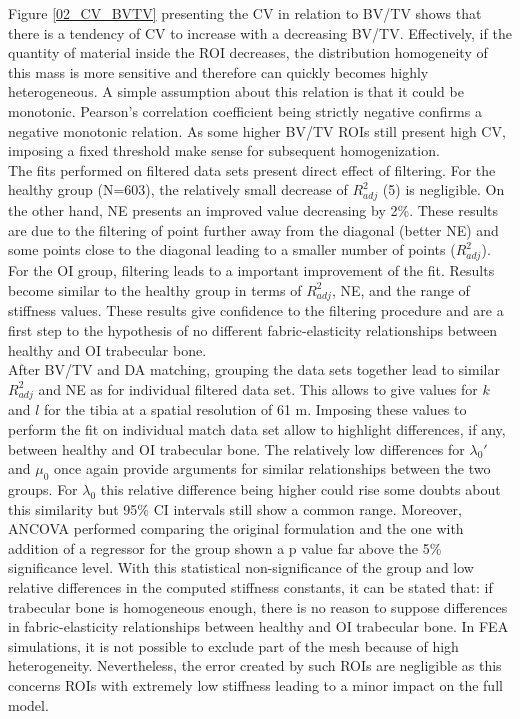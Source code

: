 \documentclass[a4paper,fleqn]{DC_ArtStyle}
\begin{document}
Figure \ref{02_CV_BVTV} presenting the CV in relation to BV/TV shows that there is a tendency of CV to increase with a decreasing BV/TV. Effectively, if the quantity of material inside the ROI decreases, the distribution homogeneity of this mass is more sensitive and therefore can quickly becomes highly heterogeneous. A simple assumption about this relation is that it could be monotonic. Pearson's correlation coefficient being strictly negative confirms a negative monotonic relation. As some higher BV/TV ROIs still present high CV, imposing a fixed threshold make sense for subsequent homogenization.\\

The fits performed on filtered data sets present direct effect of filtering. For the healthy group (N=603), the relatively small decrease of $R^2_{adj}$ (5\textperthousand) is negligible. On the other hand, NE presents an improved value decreasing by 2\%. These results are due to the filtering of point further away from the diagonal (better NE) and some points close to the diagonal leading to a smaller number of points ($R^2_{adj}$). For the OI group, filtering leads to a important improvement of the fit. Results become similar to the healthy group in terms of $R^2_{adj}$, NE, and the range of stiffness values. These results give confidence to the filtering procedure and are a first step to the hypothesis of no different fabric-elasticity relationships between healthy and OI trabecular bone.\\

After BV/TV and DA matching, grouping the data sets together lead to similar $R^2_{adj}$ and NE as for individual filtered data set. This allows to give values for $k$ and $l$ for the tibia at a spatial resolution of 61 \si{\micro}m. Imposing these values to perform the fit on individual match data set allow to highlight differences, if any, between healthy and OI trabecular bone. The relatively low differences for $\lambda_0'$ and $\mu_0$ once again provide arguments for similar relationships between the two groups. For $\lambda_0$ this relative difference being higher could rise some doubts about this similarity but 95\% CI intervals still show a common range. Moreover, ANCOVA performed comparing the original formulation and the one with addition of a regressor for the group shown a p value far above the 5\% significance level. With this statistical non-significance of the group and low relative differences in the computed stiffness constants, it can be stated that: if trabecular bone is homogeneous enough, there is no reason to suppose differences in fabric-elasticity relationships between healthy and OI trabecular bone. In FEA simulations, it is not possible to exclude part of the mesh because of high heterogeneity. Nevertheless, the error created by such ROIs are negligible as this concerns ROIs with extremely low stiffness leading to a minor impact on the full model.\\
\end{document}
